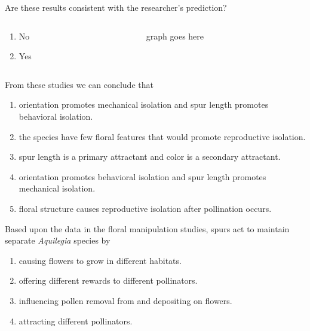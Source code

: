 \documentclass[t]{beamer}
\newcommand{\ques}[1]{\highlight{\textsc{q#1:}}}
\begin{document}
%
\begin{frame}[t]{\ques{13} Are these results consistent with the researcher's prediction?}
		\begin{columns}[t]
		\begin{column}{0.28\textwidth}
			\begin{enumerate}
				\item No
				\item Yes
			\end{enumerate}
		\end{column}
		\begin{column}{0.5\textwidth}
			graph goes here			
		\end{column}
	\end{columns}
	
\end{frame}
%
\begin{frame}[t]{\ques{14} From these studies we can conclude that}
	
	\begin{enumerate}
		\item orientation promotes mechanical isolation and spur length promotes behavioral isolation.
		\item the species have few floral features that would promote reproductive isolation.
		\item spur length is a primary attractant and color is a secondary attractant.
		\item orientation promotes behavioral isolation and spur length promotes mechanical isolation.
		\item floral structure causes reproductive isolation after pollination occurs.
	\end{enumerate}
\end{frame}
%
\begin{frame}[t]{Based upon the data in the floral manipulation studies, spurs act to maintain separate \textit{Aquilegia} species by}
	
	\begin{enumerate}
		\item causing flowers to grow in different habitats.
		\item offering different rewards to different pollinators.
		\item influencing pollen removal from and depositing on flowers. 
		\item attracting different pollinators.
	\end{enumerate}
\end{frame}
\end{document}
